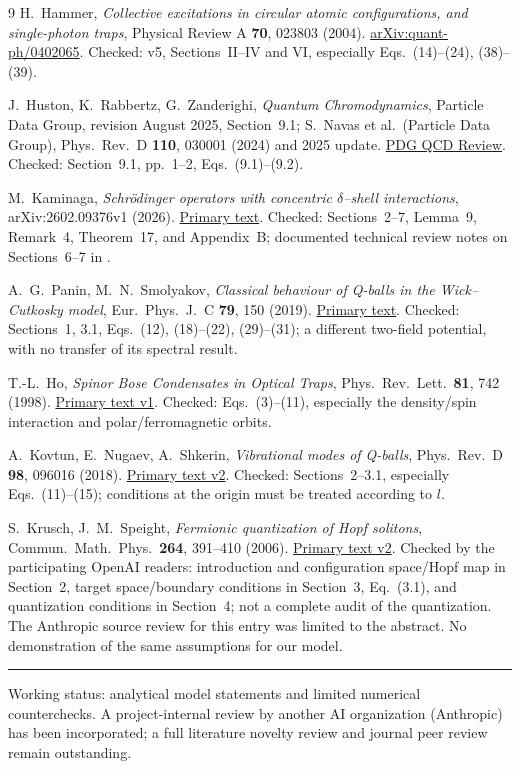 \documentclass[a4paper,11pt]{article}
\begin{document}
{}
\begin{thebibliography}{9}
H.~Hammer, \emph{Collective excitations in circular atomic configurations, and single-photon traps}, Physical Review A \textbf{70}, 023803 (2004).
\href{https://arxiv.org/abs/quant-ph/0402065}{arXiv:quant-ph/0402065}.
Checked: v5, Sections~II--IV and VI, especially Eqs.~(14)--(24), (38)--(39).

J.~Huston, K.~Rabbertz, G.~Zanderighi, \emph{Quantum Chromodynamics}, Particle Data Group, revision August 2025, Section~9.1; S.~Navas et al.\ (Particle Data Group), Phys.\ Rev.\ D \textbf{110}, 030001 (2024) and 2025 update.
\href{https://pdg.lbl.gov/2025/reviews/rpp2025-rev-qcd.pdf}{PDG QCD Review}.
Checked: Section~9.1, pp.~1--2, Eqs.~(9.1)--(9.2).

M.~Kaminaga, \emph{Schr\"odinger operators with concentric $\delta$--shell interactions}, arXiv:2602.09376v1 (2026).
\href{https://arxiv.org/html/2602.09376v1}{Primary text}.
Checked: Sections~2--7, Lemma~9, Remark~4, Theorem~17, and Appendix~B; documented technical review notes on Sections~6--7 in .

A.~G.~Panin, M.~N.~Smolyakov, \emph{Classical behaviour of Q-balls in the Wick--Cutkosky model}, Eur.\ Phys.\ J.\ C \textbf{79}, 150 (2019).
\href{https://link.springer.com/article/10.1140/epjc/s10052-019-6638-2}{Primary text}.
Checked: Sections~1, 3.1, Eqs.~(12), (18)--(22), (29)--(31); a different two-field potential, with no transfer of its spectral result.

T.-L.~Ho, \emph{Spinor Bose Condensates in Optical Traps}, Phys.\ Rev.\ Lett.\ \textbf{81}, 742 (1998).
\href{https://arxiv.org/html/cond-mat/9803231v1}{Primary text v1}.
Checked: Eqs.~(3)--(11), especially the density/spin interaction and polar/ferromagnetic orbits.

A.~Kovtun, E.~Nugaev, A.~Shkerin, \emph{Vibrational modes of Q-balls}, Phys.\ Rev.\ D \textbf{98}, 096016 (2018).
\href{https://arxiv.org/html/1805.03518v2}{Primary text v2}.
Checked: Sections~2--3.1, especially Eqs.~(11)--(15); conditions at the origin must be treated according to $l$.

S.~Krusch, J.~M.~Speight, \emph{Fermionic quantization of Hopf solitons}, Commun.\ Math.\ Phys.\ \textbf{264}, 391--410 (2006).
\href{https://arxiv.org/html/hep-th/0503067v2}{Primary text v2}.
Checked by the participating OpenAI readers: introduction and configuration space/Hopf map in Section~2, target space/boundary conditions in Section~3, Eq.~(3.1), and quantization conditions in Section~4; not a complete audit of the quantization. The Anthropic source review for this entry was limited to the abstract. No demonstration of the same assumptions for our model.
\end{thebibliography}

\bigskip\hrule\smallskip
{\small Working status: analytical model statements and limited numerical counterchecks. A project-internal review by another AI organization (Anthropic) has been incorporated; a full literature novelty review and journal peer review remain outstanding.\par}
\end{document}

